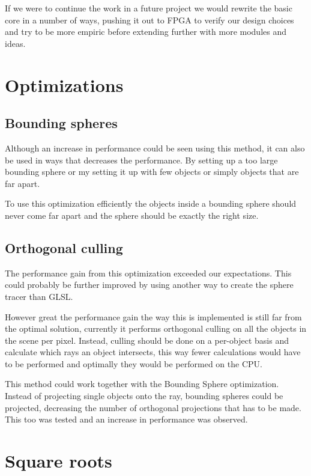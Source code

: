 			If we were to continue the work in a future project we would
			rewrite the basic core in a number of ways, pushing it out to FPGA
			to verify our design choices and try to be more empiric before
			extending further with more modules and ideas. 

	\section{Optimizations} \label{optimization}

		\subsection{Bounding spheres}
			
			Although an increase in performance could be seen using this
			method, it can also be used in ways that decreases the performance.
			By setting up a too large bounding sphere or my setting it up with
			few objects or simply objects that are far apart.

			To use this optimization efficiently the objects inside a bounding 
			sphere should never come far apart and the sphere should be exactly 
			the right size.

		\subsection{Orthogonal culling}

			The performance gain from this optimization exceeded our 
			expectations. This could probably be further improved by using
			another way to create the sphere tracer than GLSL. 

			However great the performance gain the way this is implemented
			is still far from the optimal solution, currently it performs 
			orthogonal culling on all the objects in the scene per pixel. 
			Instead, culling should be done on a per-object basis and calculate
			which rays an object intersects, this way fewer calculations would
			have to be performed and optimally they would be performed on the
			CPU.

			This method could work together with the Bounding Sphere 
			optimization. Instead of projecting single objects onto the ray,
			bounding spheres could be projected, decreasing the number of 
			orthogonal projections that has to be made. This too was tested 
			and an increase in performance was observed.

	\section{Square roots}

